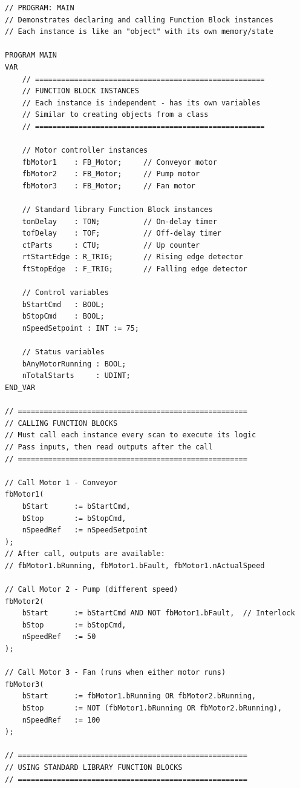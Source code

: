 \documentclass[11pt,a4paper]{article}
\begin{document}
\begin{lstlisting}
// PROGRAM: MAIN
// Demonstrates declaring and calling Function Block instances
// Each instance is like an "object" with its own memory/state

PROGRAM MAIN
VAR
    // =====================================================
    // FUNCTION BLOCK INSTANCES
    // Each instance is independent - has its own variables
    // Similar to creating objects from a class
    // =====================================================
    
    // Motor controller instances
    fbMotor1    : FB_Motor;     // Conveyor motor
    fbMotor2    : FB_Motor;     // Pump motor
    fbMotor3    : FB_Motor;     // Fan motor
    
    // Standard library Function Block instances
    tonDelay    : TON;          // On-delay timer
    tofDelay    : TOF;          // Off-delay timer
    ctParts     : CTU;          // Up counter
    rtStartEdge : R_TRIG;       // Rising edge detector
    ftStopEdge  : F_TRIG;       // Falling edge detector
    
    // Control variables
    bStartCmd   : BOOL;
    bStopCmd    : BOOL;
    nSpeedSetpoint : INT := 75;
    
    // Status variables
    bAnyMotorRunning : BOOL;
    nTotalStarts     : UDINT;
END_VAR

// =====================================================
// CALLING FUNCTION BLOCKS
// Must call each instance every scan to execute its logic
// Pass inputs, then read outputs after the call
// =====================================================

// Call Motor 1 - Conveyor
fbMotor1(
    bStart      := bStartCmd,
    bStop       := bStopCmd,
    nSpeedRef   := nSpeedSetpoint
);
// After call, outputs are available:
// fbMotor1.bRunning, fbMotor1.bFault, fbMotor1.nActualSpeed

// Call Motor 2 - Pump (different speed)
fbMotor2(
    bStart      := bStartCmd AND NOT fbMotor1.bFault,  // Interlock
    bStop       := bStopCmd,
    nSpeedRef   := 50
);

// Call Motor 3 - Fan (runs when either motor runs)
fbMotor3(
    bStart      := fbMotor1.bRunning OR fbMotor2.bRunning,
    bStop       := NOT (fbMotor1.bRunning OR fbMotor2.bRunning),
    nSpeedRef   := 100
);

// =====================================================
// USING STANDARD LIBRARY FUNCTION BLOCKS
// =====================================================


\end{lstlisting}
\end{document}
